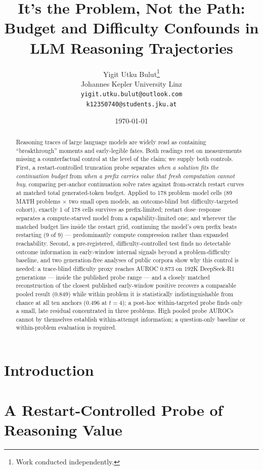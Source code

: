 \documentclass[11pt]{article}
\title{It's the Problem, Not the Path:\\
Budget and Difficulty Confounds in LLM Reasoning Trajectories}
\author{Yigit Utku Bulut\thanks{Work conducted independently.}\\
Johannes Kepler University Linz\\
\texttt{yigit.utku.bulut@outlook.com}\\
\texttt{k12350740@students.jku.at}}
\date{\today}
\begin{document}
\maketitle

\begin{abstract}
Reasoning traces of large language models are widely read as containing
``breakthrough'' moments and early-legible fates. Both readings rest on
measurements missing a counterfactual control at the level of the claim;
we supply both controls. First, a restart-controlled truncation probe
separates \emph{when a solution fits the continuation budget} from
\emph{when a prefix carries value that fresh computation cannot buy},
comparing per-anchor continuation solve rates against from-scratch
restart curves at matched total generated-token budget. Applied to 178
problem--model cells (89 MATH problems $\times$ two small open models, an
outcome-blind but difficulty-targeted cohort), exactly 1 of 178 cells
survives as prefix-limited; restart dose--response separates a
compute-starved model from a capability-limited one; and wherever the
matched budget lies inside the restart grid, continuing the model's own
prefix beats restarting (9 of 9) --- predominantly compute compression
rather than expanded reachability. Second, a pre-registered,
difficulty-controlled test finds no detectable outcome information in
early-window internal signals beyond a problem-difficulty baseline, and
two generation-free analyses of public corpora show why this control is
needed: a trace-blind difficulty proxy reaches AUROC 0.873 on 192K
DeepSeek-R1 generations --- inside the published probe range --- and
a closely matched reconstruction of the closest published early-window
positive recovers a comparable pooled result (0.849) while
within problem it is statistically indistinguishable from chance at all
ten anchors (0.496 at $t{=}4$); a post-hoc within-targeted probe finds
only a small, late residual concentrated in three problems. High pooled
probe AUROCs cannot by
themselves establish within-attempt information; a question-only baseline
or within-problem evaluation is required.
\end{abstract}

\section{Introduction}\label{sec:intro}


\section{A Restart-Controlled Probe of Reasoning Value}\label{sec:method}

\end{document}
